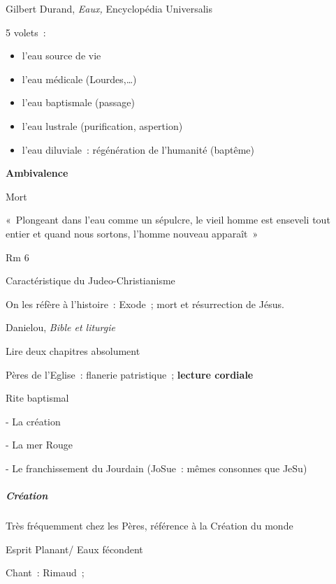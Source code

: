 Gilbert Durand, \emph{Eaux,} Encyclopédia Universalis

5 volets~:

\begin{itemize}
\item
   
  l'eau source de vie
   
\item
   
  l'eau médicale (Lourdes,\ldots)
   
\item
   
  l'eau baptismale (passage)
   
\item
   
  l'eau lustrale (purification, aspertion)
   
\item
   
  l'eau diluviale~: régénération de l'humanité (baptême)
   
\end{itemize}

\textbf{Ambivalence}

Mort
 
    «~Plongeant dans l'eau comme un sépulcre, le vieil homme est enseveli
tout entier et quand nous sortons, l'homme nouveau apparaît~»
 



Rm 6

Caractéristique du Judeo-Christianisme

On les réfère à l'histoire~: Exode~; mort et résurrection de Jésus.

Danielou, \emph{Bible et liturgie}

Lire deux chapitres absolument

Pères de l'Eglise~: flanerie patristique~; \textbf{lecture cordiale}

Rite baptismal

- La création

- La mer Rouge

- Le franchissement du Jourdain (JoSue~: mêmes consonnes que JeSu)

\hypertarget{cruxe9ation}{%
\subparagraph{Création}\label{cruxe9ation}}

Très fréquemment chez les Pères, référence à la Création du monde

Esprit Planant/ Eaux fécondent

Chant~: Rimaud~;

